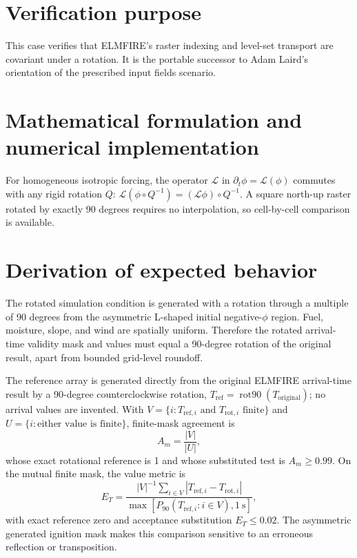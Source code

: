 \section{Verification purpose}

This case verifies that ELMFIRE's raster indexing and level-set transport are covariant under a \RotationAngle{} rotation. It is the portable successor to Adam Laird's orientation of the prescribed input fields scenario.

\section{Mathematical formulation and numerical implementation}

For homogeneous isotropic forcing, the operator $\mathcal{L}$ in $\partial_t\phi=\mathcal{L}(\phi)$ commutes with any rigid rotation $Q$: $\mathcal{L}(\phi\circ Q^{-1})=(\mathcal{L}\phi)\circ Q^{-1}$. A square north-up raster rotated by exactly 90 degrees requires no interpolation, so cell-by-cell comparison is available.

\section{Derivation of expected behavior}

The rotated simulation condition is generated with a rotation through a multiple of 90 degrees from the asymmetric L-shaped initial negative-$\phi$ region. Fuel, moisture, slope, and wind are spatially uniform. Therefore the rotated arrival-time validity mask and values must equal a 90-degree rotation of the original result, apart from bounded grid-level roundoff.

The reference array is generated directly from the original ELMFIRE
arrival-time result by a 90-degree counterclockwise rotation,
\(T_{\mathrm{ref}}=\operatorname{rot90}(T_{\mathrm{original}})\); no
arrival values are invented.  With
\(V=\{i:T_{\mathrm{ref},i}\text{ and }T_{\mathrm{rot},i}\text{ finite}\}\)
and \(U=\{i:\text{either value is finite}\}\), finite-mask agreement is
\[
 A_m=\frac{|V|}{|U|},
\]
whose exact rotational reference is 1 and whose substituted test is
\(A_m\geq0.99\).  On the mutual finite mask, the value metric is
\[
 E_T=\frac{|V|^{-1}\sum_{i\in V}
 |T_{\mathrm{ref},i}-T_{\mathrm{rot},i}|}
 {\max[P_{90}(T_{\mathrm{ref},i}:i\in V),1~\mathrm{s}]},
\]
with exact reference zero and acceptance substitution \(E_T\leq0.02\).
The asymmetric generated ignition mask makes this comparison sensitive to
an erroneous reflection or transposition.

